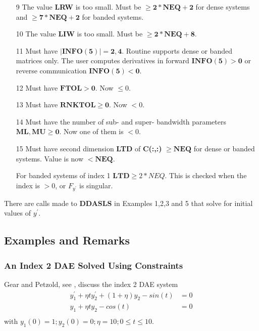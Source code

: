 \documentclass[twoside]{MATH77}
\begin{document}
\begin{description}
\begin{enumerate}
\item[9] The value \textbf{LRW} is too small.  Must be $\geq
  \mathbf{2*NEQ+2}$ for dense systems and $\geq \mathbf{7*NEQ+2}$ for
  banded systems. 
\item[10] The value \textbf{LIW} is too small.  Must be $\geq \mathbf{2*NEQ+8}$.
\item[11] Must have $\mathbf{|INFO(5)|=2,4}$.  Routine supports dense
  or banded matrices only. The user computes derivatives in forward
  $\mathbf{INFO(5) > 0}$ or reverse communication $\mathbf{INFO(5) <
    0}$.
\item[12] Must have $\mathbf{FTOL > 0}$. Now $ \leq 0$.
\item[13] Must have $\mathbf{RNKTOL \geq 0}$. Now $ < 0$.
\item[14] Must have the number of sub- and super- bandwidth parameters
  $\mathbf{ML, MU \geq 0}$.  Now one of them is $< 0$.
\item[15] Must have second dimension \textbf{LTD} of
  \textbf{C(:,:)} $ \geq \mathbf{NEQ}$ for dense or banded
  systems. Value is now $< \mathbf{NEQ}$.


         For banded systems of index 1 $\mathbf{LTD} \geq 2*NEQ$.  This
         is checked when the index is $> 0$, or $F_{y^{\prime}}$ is singular.
\end{enumerate}

There are calls made to \textbf{DDASLS} in Examples 1,2,3 and 5 that
solve for initial values of $y^{\prime}$.    
\end{description}















\subsection{Examples and Remarks}

\subsubsection{An Index 2 DAE Solved Using Constraints}
Gear and Petzold, see \cite{Gear:1988:CWG}, discuss the index 2 DAE system
\begin{align*}
  y_{1}^{\prime}+\eta t y_{2}^{\prime}+(1+\eta)y_2-sin(t)&=0 \\
  y_1+\eta t y_2-cos(t)&=0 \\
\end{align*}
with $y_1(0)=1; y_2(0)=0;  \eta =10;  0 \leq t \leq 10$.
\end{document}

